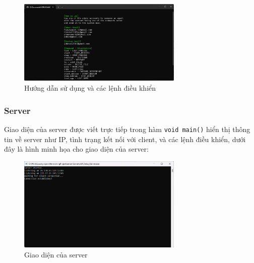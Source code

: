 \begin{figure}[H]
    \centering
    \includegraphics[width=0.7\textwidth]{img/instruction.png}
    \caption{Hướng dẫn sử dụng và các lệnh điều khiển}
\end{figure}

\subsubsection{Server}

Giao diện của server được viết trực tiếp trong hàm \texttt{void main()} hiển thị thông tin về server như IP, tình trạng kết nối với client, và các lệnh điều khiển, dưới đây là hình minh họa cho giao diện của server:

\begin{figure}[H]
    \centering
    \includegraphics[width=0.7\textwidth]{img/server.png}
    \caption{Giao diện của server}
\end{figure}